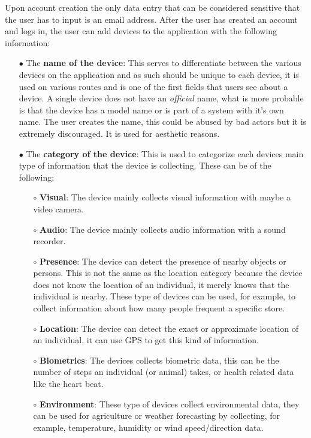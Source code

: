 Upon account creation the only data entry that can be considered sensitive that
the user has to input is an email address.
After the user has created an account and logs in, the user can add devices to the application with the following information:

\begin{itemize}
    \item[$\bullet$]
    The \textbf{name of the device}: This serves to differentiate between the various devices on the application and as such should be unique to each device, it is used on various routes and is one of the first fields that users see about a device. A single device does not have an \textit{official} name, what is more probable is that the device has a model name or is part of a system with it's own name. The user creates the name, this could be abused by bad actors but it is extremely discouraged. It is used for aesthetic reasons.
    \item[$\bullet$]
    The \textbf{category of the device}: This is used to categorize each devices main type of information that the device is collecting. These can be of the following:
    \begin{itemize}
        \item[$\circ$] \textbf{Visual}: The device mainly collects visual information with maybe a video camera.
        \item[$\circ$] \textbf{Audio}: The device mainly collects audio information with a sound recorder.
        \item[$\circ$] \textbf{Presence}: The device can detect the presence of nearby objects or persons. This is not the same as the location category because the device does not know the location of an individual, it merely knows that the individual is nearby. These type of devices can be used, for example, to collect information about how many people frequent a specific store.
        \item[$\circ$] \textbf{Location}: The device can detect the exact or approximate location of an individual, it can use GPS to get this kind of information.
        \item[$\circ$] \textbf{Biometrics}: The devices collects biometric data, this can be the number of steps an individual (or animal) takes, or health related data like the heart beat.
        \item[$\circ$] \textbf{Environment}: These type of devices collect environmental data, they can be used for agriculture or weather forecasting by collecting, for example, temperature, humidity or wind speed/direction data.

\end{itemize}
\end{itemize}
